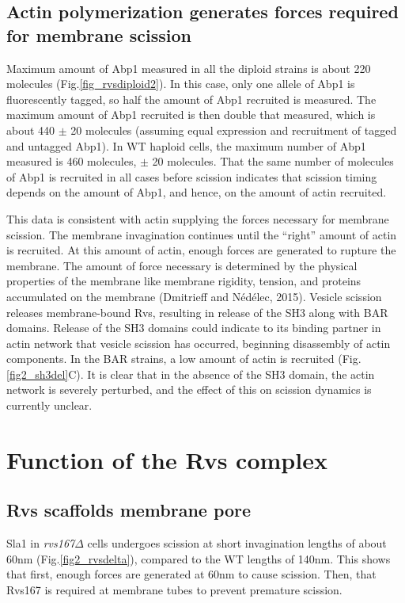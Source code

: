 \subsection{ Actin polymerization generates forces required for membrane scission}
Maximum amount of Abp1 measured in all the diploid strains is about 220 molecules (Fig.\ref{fig_rvsdiploid2}). In this case, only one allele of Abp1 is fluorescently tagged, so half the amount of Abp1 recruited is measured. The maximum amount of Abp1 recruited is then double that measured, which is about 440 $\pm$ 20 molecules (assuming equal expression and recruitment of tagged and untagged Abp1). In WT haploid cells, the maximum number of Abp1 measured is 460 molecules, $\pm$ 20 molecules. That the same number of molecules of Abp1 is recruited in all cases before scission indicates that scission timing depends on the amount of Abp1, and hence, on the amount of actin recruited. 

\vspace{5mm}
This data is consistent with actin supplying the forces necessary for membrane scission. The membrane invagination continues until the “right” amount of actin is recruited. At this amount of actin, enough forces are generated to rupture the membrane. The amount of force necessary is determined by the physical properties of the membrane like membrane rigidity, tension, and proteins accumulated on the membrane (Dmitrieff and Nédélec, 2015). Vesicle scission releases membrane-bound Rvs, resulting in release of the SH3 along with BAR domains. Release of the SH3 domains could indicate to its binding partner in actin network that vesicle scission has occurred, beginning disassembly of actin components. In the BAR strains, a low amount of actin is recruited (Fig.\ref{fig2_sh3del}C). It is clear that in the absence of the SH3 domain, the actin network is severely perturbed, and the effect of this on scission dynamics is currently unclear. 

\section{Function of the Rvs complex}

\subsection{Rvs scaffolds membrane pore}
Sla1 in \textit{rvs167$\Delta$} cells undergoes scission at short invagination lengths of about 60nm (Fig.\ref{fig2_rvsdelta}), compared to the WT lengths of 140nm. This shows that first, enough forces are generated at 60nm to cause scission. Then, that Rvs167 is required at membrane tubes to prevent premature scission. 

